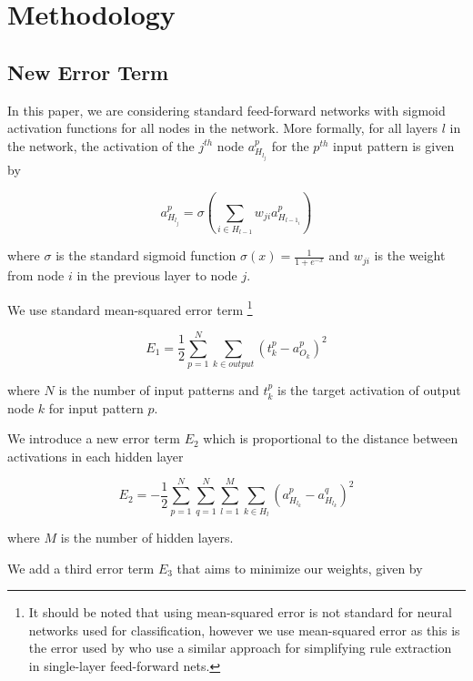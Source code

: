 \section{Methodology}
\label{sec:method}

\subsection{New Error Term}
\label{sec:nn}

In this paper, we are considering standard feed-forward networks with
sigmoid activation functions for all nodes in the network. More formally,
for all layers $l$ in the network, the activation of the $j^{th}$ node
$a_{H_{l_j}}^p$ for the $p^{th}$ input pattern is given by

\begin{equation}
  a_{H_{l_j}}^p = \sigma(\sum_{i\in H_{l-1}}{w_{ji}a_{H_{l-1_i}}^p})
\end{equation}

where $\sigma$ is the standard sigmoid function $\sigma(x)=\frac{1}{1+e^{-x}}$
and $w_{ji}$ is the weight from node $i$ in the previous layer to node $j$.

We use standard mean-squared error term
\footnote{
It should be noted that using
mean-squared error is not standard for neural networks used for
classification, however we use mean-squared error as this is the error
used by \cite{thuan11} who use a similar approach for simplifying rule
extraction in single-layer feed-forward nets.
}

\begin{equation}
  E_1 = \frac{1}{2}\sum_{p=1}^{N} \sum_{k \in output} (t_k^p-a_{O_k}^p)^2
\end{equation}

where $N$ is the number of input patterns and $t_k^p$ is the target activation
of output node $k$ for input pattern $p$.

We introduce a new error term $E_2$ which is proportional to the distance between
activations in each hidden layer

\begin{equation}
  E_2 = -\frac{1}{2}\sum_{p=1}^{N} \sum_{q=1}^{N} \sum_{l=1}^{M} \sum_{k \in H_l} (a_{H_{l_k}}^p - a_{H_{l_k}}^q)^2
\end{equation}

where $M$ is the number of hidden layers.

We add a third error term $E_3$ that aims to minimize our weights, given
by

